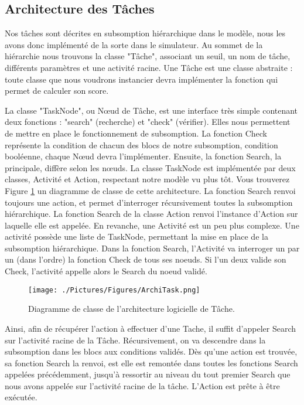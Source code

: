 			\subsection{Architecture des Tâches}
			Nos tâches sont décrites en subsomption hiérarchique dans le modèle, nous les avons donc implémenté de la sorte dans le simulateur. Au sommet de la hiérarchie nous trouvons la classe "Tâche", associant un seuil, un nom de tâche, différents paramètres et une activité racine. Une Tâche est une classe abstraite : toute classe que nous voudrons instancier devra implémenter la fonction qui permet de calculer son score.
			
			La classe "TaskNode", ou Nœud de Tâche, est une interface très simple contenant deux fonctions : "search" (recherche) et "check" (vérifier). Elles nous permettent de mettre en place le fonctionnement de subsomption. La fonction Check représente la condition de chacun des blocs de notre subsomption, condition booléenne, chaque Nœud devra l'implémenter. Ensuite, la fonction Search, la principale, diffère selon les nœuds. La classe TaskNode est implémentée par deux classes, Activité et Action, respectant notre modèle vu plus tôt. Vous trouverez Figure \ref{ArchiTask} un diagramme de classe de cette architecture. La fonction Search renvoi toujours une action, et permet d'interroger récursivement toutes la subsomption hiérarchique. La fonction Search de la classe Action renvoi l'instance d'Action sur laquelle elle est appelée. En revanche, une Activité est un peu plus complexe. Une activité possède une liste de TaskNode, permettant la mise en place de la subsomption hiérarchique. Dans la fonction Search, l'Activité va interroger un par un (dans l'ordre) la fonction Check de tous ses noeuds. Si l'un deux valide son Check, l'activité appelle alors le Search du noeud validé.
			
			\begin{figure}
			\centering
			\texttt{[image: ./Pictures/Figures/ArchiTask.png]}
			\caption{Diagramme de classe de l'architecture logicielle de Tâche.}
			\label{ArchiTask}
			\end{figure}
			
			Ainsi, afin de récupérer l'action à effectuer d'une Tache, il suffit d'appeler Search sur l'activité racine de la Tâche. Récursivement, on va descendre dans la subsomption dans les blocs aux conditions validés. Dès qu'une action est trouvée, sa fonction Search la renvoi, est elle est remontée dans toutes les fonctions Search appelées précédemment, jusqu'à ressortir au niveau du tout premier Search que nous avons appelée sur l'activité racine de la tâche. L'Action est prête à être exécutée.
			
